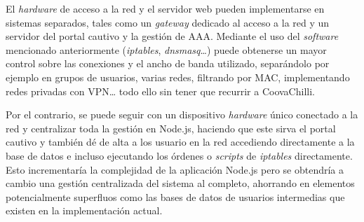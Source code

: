 El \emph{hardware} de acceso a la red y el servidor web pueden implementarse en sistemas separados, tales como un \emph{gateway} dedicado al acceso a la red y un servidor del portal cautivo y la gestión de AAA. Mediante el uso del \emph{software} mencionado anteriormente (\emph{iptables}, \emph{dnsmasq}…) puede obtenerse un mayor control sobre las conexiones y el ancho de banda utilizado, separándolo por ejemplo en grupos de usuarios, varias redes, filtrando por MAC, implementando redes privadas con VPN… todo ello sin tener que recurrir a CoovaChilli.

Por el contrario, se puede seguir con un dispositivo \emph{hardware} único conectado a la red y centralizar toda la gestión en Node.js, haciendo que este sirva el portal cautivo y también dé de alta a los usuario en la red accediendo directamente a la base de datos e incluso ejecutando los órdenes o \emph{scripts} de \emph{iptables} directamente. Esto incrementaría la complejidad de la aplicación Node.js pero se obtendría a cambio una gestión centralizada del sistema al completo, ahorrando en elementos potencialmente superfluos como las bases de datos de usuarios intermedias que existen en la implementación actual.


